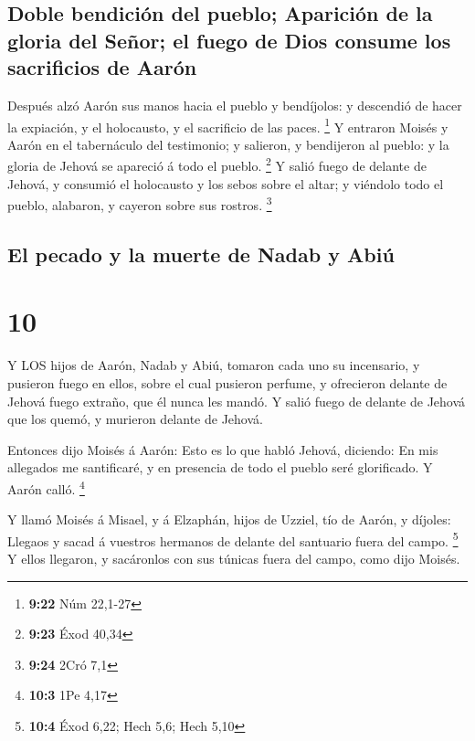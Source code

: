\hypertarget{doble-bendiciuxf3n-del-pueblo-apariciuxf3n-de-la-gloria-del-seuxf1or-el-fuego-de-dios-consume-los-sacrificios-de-aaruxf3n}{%
\subsection{Doble bendición del pueblo; Aparición de la gloria del
Señor; el fuego de Dios consume los sacrificios de
Aarón}\label{doble-bendiciuxf3n-del-pueblo-apariciuxf3n-de-la-gloria-del-seuxf1or-el-fuego-de-dios-consume-los-sacrificios-de-aaruxf3n}}

 Después alzó Aarón sus manos hacia el pueblo y bendíjolos:
y descendió de hacer la expiación, y el holocausto, y el sacrificio de
las paces. \footnote{\textbf{9:22} Núm 22,1-27}  Y entraron
Moisés y Aarón en el tabernáculo del testimonio; y salieron, y
bendijeron al pueblo: y la gloria de Jehová se apareció á todo el
pueblo. \footnote{\textbf{9:23} Éxod 40,34}  Y salió fuego
de delante de Jehová, y consumió el holocausto y los sebos sobre el
altar; y viéndolo todo el pueblo, alabaron, y cayeron sobre sus rostros.
\footnote{\textbf{9:24} 2Cró 7,1}

\hypertarget{el-pecado-y-la-muerte-de-nadab-y-abiuxfa}{%
\subsection{El pecado y la muerte de Nadab y
Abiú}\label{el-pecado-y-la-muerte-de-nadab-y-abiuxfa}}

\hypertarget{section-9}{%
\section{10}\label{section-9}}

 Y LOS hijos de Aarón, Nadab y Abiú, tomaron cada uno su
incensario, y pusieron fuego en ellos, sobre el cual pusieron perfume, y
ofrecieron delante de Jehová fuego extraño, que él nunca les mandó.
 Y salió fuego de delante de Jehová que los quemó, y
murieron delante de Jehová.

 Entonces dijo Moisés á Aarón: Esto es lo que habló Jehová,
diciendo: En mis allegados me santificaré, y en presencia de todo el
pueblo seré glorificado. Y Aarón calló. \footnote{\textbf{10:3} 1Pe 4,17}

 Y llamó Moisés á Misael, y á Elzaphán, hijos de Uzziel, tío
de Aarón, y díjoles: Llegaos y sacad á vuestros hermanos de delante del
santuario fuera del campo. \footnote{\textbf{10:4} Éxod 6,22; Hech 5,6;
  Hech 5,10}  Y ellos llegaron, y sacáronlos con sus túnicas
fuera del campo, como dijo Moisés.

